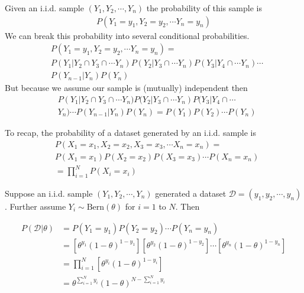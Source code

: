 Given an i.i.d. sample $(Y_{1},Y_{2},\cdots,Y_{n})$ the probability of this sample is 
\begin{align}
    P(Y_{1} = y_{1}, Y_{2} = y_{2}, \cdots Y_{n} = y_{n})
\end{align}
We can break this probability into several conditional probabilities.
\begin{align}
    &P(Y_{1} = y_{1}, Y_{2} = y_{2}, \cdots Y_{n} = y_{n}) =\\  &P(Y_{1} | Y_{2} \cap Y_{3} \cap \cdots Y_{n} ) P( Y_{2} | Y_{3} \cap \cdots Y_{n} ) P(Y_{3} | Y_{4} \cap \cdots Y_{n}) \cdots \\
    &P(Y_{n-1} | Y_{n}) P(Y_{n})
\end{align}
But because we assume our sample is (mutually) independent then 
\begin{align}
     &P(Y_{1} | Y_{2} \cap Y_{3} \cap \cdots Y_{n} ) P( Y_{2} | Y_{3} \cap \cdots Y_{n} ) P(Y_{3} | Y_{4} \cap \cdots\\
     &Y_{n}) \cdots P(Y_{n-1} | Y_{n}) P(Y_{n}) = P(Y_1) P(Y_{2}) \cdots P(Y_{n})
\end{align}

To recap, the probability of a dataset generated by an i.i.d. sample is 
\begin{align}
    &P(X_{1} = x_{1}, X_{2} = x_{2}, X_{3} = x_{3}, \cdots X_{n} = x_{n}   ) =\\
    &P(X_{1}=x_{1}) P(X_{2}=x_{2}) P(X_{3}=x_{3})\cdots P(X_{n}=x_{n}) \\ 
    &= \prod_{i=1}^{N} P(X_{i} = x_{i})
\end{align}

\ex Suppose an i.i.d. sample $(Y_{1},Y_{2},\cdots, Y_{n})$ generated a dataset $\mathcal{D} = (y_{1},y_{2},\cdots,y_{n})$. Further assume $Y_{i} \sim \text{Bern}(\theta)$ for $i=1$ to $N$. Then

\begin{align}
    P(\mathcal{D} | \theta ) &= P(Y_{1}=y_{1}) P(Y_{2}=y_{2}) \cdots P(Y_{n}=y_{n}) \\ 
                             &= \left[\theta^{y_{1}}(1 - \theta)^{1-y_{1}}\right]\left[\theta^{y_{2}}(1 - \theta)^{1-y_{2}}\right] \cdots \left[\theta^{y_{n}}(1 - \theta)^{1-y_{n}}\right] \\ 
                             &= \prod_{i=1}^{N} \left[\theta^{y_{i}}(1 - \theta)^{1-y_{i}}\right] \\ 
                             &= \theta^{ \sum_{i=1}^{N} y_{i}  } (1-\theta)^{N - \sum_{i=1}^{N} y_{i}  }
\end{align}

